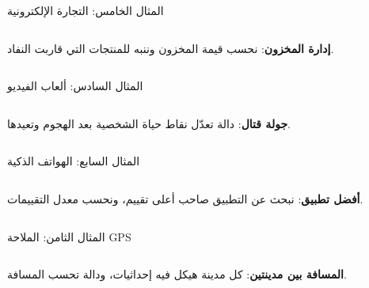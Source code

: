 \documentclass[aspectratio=169, 11pt, t, xcolor={table}]{beamer}
\begin{document}
\begin{frame}[t]{المثال الخامس: التجارة الإلكترونية}
    \begin{columns}[T]
        {\small \textbf{إدارة المخزون}: نحسب قيمة المخزون وننبه للمنتجات التي قاربت النفاد.\par}
        \vspace{0.3cm}
    \end{columns}
\end{frame}

\begin{frame}[t]{المثال السادس: ألعاب الفيديو}
    \begin{columns}[T]
        {\small \textbf{جولة قتال}: دالة تعدّل نقاط حياة الشخصية بعد الهجوم وتعيدها.\par}
        \vspace{0.3cm}
    \end{columns}
\end{frame}

\begin{frame}[t]{المثال السابع: الهواتف الذكية}
    \begin{columns}[T]
        {\small \textbf{أفضل تطبيق}: نبحث عن التطبيق صاحب أعلى تقييم، ونحسب معدل التقييمات.\par}
        \vspace{0.3cm}
    \end{columns}
\end{frame}

\begin{frame}[t]{المثال الثامن: الملاحة \textenglish{GPS}}
    \begin{columns}[T]
        {\small \textbf{المسافة بين مدينتين}: كل مدينة هيكل فيه إحداثيات، ودالة تحسب المسافة.\par}
        \vspace{0.3cm}
    \end{columns}
\end{frame}
\end{document}

